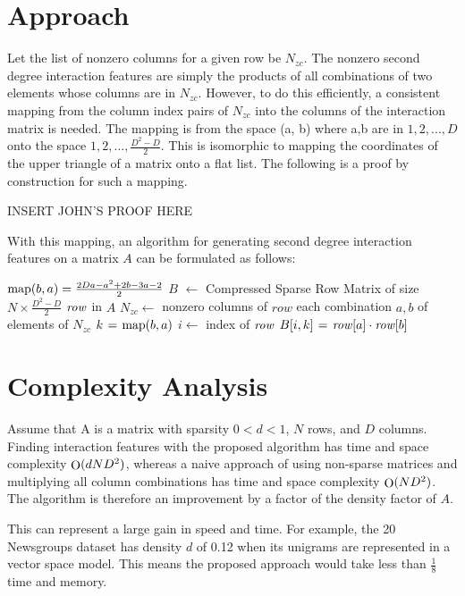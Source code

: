 \documentclass[twoside,11pt]{article}
\begin{document}
\section{Approach}
Let the list of nonzero columns for a given row be $N_{zc}$. The nonzero second degree 
interaction features are simply the products of all combinations of two elements whose 
columns are in $N_{zc}$. However, to do this efficiently, a consistent mapping from the column 
index pairs of $N_{zc}$ into the columns of the interaction matrix is needed. The mapping is 
from the space (a, b) where a,b are in $1,2,..., D$ onto the space $1,2,..., \frac{D^2-D}{2}$. This 
is isomorphic to mapping the coordinates of the upper triangle of a matrix onto a flat 
list. The following is a proof by construction for such a mapping.

INSERT JOHN'S PROOF HERE

With this mapping, an algorithm for generating second degree interaction features on a 
matrix $A$ can be formulated as follows:

\begin{codebox}
    \zi $\func{map}(b, a) = \frac{2Da-a^2+2b-3a-2}{2}$
    \zi $B$ $\gets$ Compressed Sparse Row Matrix of size $N \times \frac{D^2-D}{2}$
    \zi \For $\id{row}$ in $A$ \Repeat
    \zi     $N_{zc} \gets$ nonzero columns of $row$
    \zi     \For each combination $a, b$ of elements of $N_{zc}$ \Repeat
    \zi         $k \gets \func{map}(b, a)$
    \zi         $i \gets$ index of $\id{row}$
    \zi         $B[i, k] \gets \id{row}[a] \cdot \id{row}[b]$
            \End
       	\End
\end{codebox}

\section{Complexity Analysis}
Assume that A is a matrix with sparsity $0 < d < 1$, $N$ rows, and $D$ columns. Finding 
interaction features with the proposed algorithm has time and space complexity 
$\func{O}(d N D^2)$, 
whereas a naive approach of using non-sparse matrices and multiplying all column 
combinations has time and space complexity $\func{O}(N D^2)$. The algorithm is therefore an 
improvement by a factor of the density factor of $A$.

This can represent a large gain in speed and time. For example, the 20 Newsgroups dataset 
has density $d$ of 0.12 when its unigrams are represented in a vector space model. This 
means the proposed approach would take less than $\frac{1}{8}$ time and memory.
\end{document}
